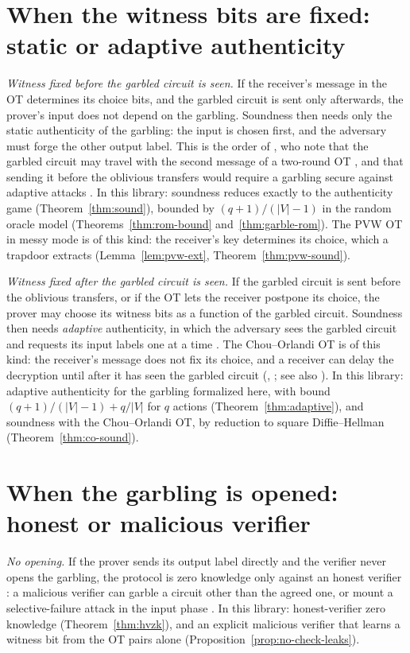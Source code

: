 \section{When the witness bits are fixed: static or adaptive authenticity}

\emph{Witness fixed before the garbled circuit is seen.} If the receiver's message in the OT
determines its choice bits, and the garbled circuit is sent only afterwards, the prover's input
does not depend on the garbling. Soundness then needs only the static authenticity of the garbling:
the input is chosen first, and the adversary must forge the other output label. This is the order of
\cite{JKO13}, who note that the garbled circuit may travel with the second message of a two-round
OT \cite[Sect.~1.1]{JKO13}, and that sending it before the oblivious transfers would require a
garbling secure against adaptive attacks \cite[Sect.~3, footnote~7]{JKO13}. In this library: soundness reduces exactly to
the authenticity game (Theorem~\ref{thm:sound}), bounded by $(q+1)/(|V|-1)$ in the random oracle
model (Theorems~\ref{thm:rom-bound} and~\ref{thm:garble-rom}). The PVW OT in messy mode is of this
kind: the receiver's key determines its choice, which a trapdoor extracts (Lemma~\ref{lem:pvw-ext},
Theorem~\ref{thm:pvw-sound}).

\emph{Witness fixed after the garbled circuit is seen.} If the garbled circuit is sent before the
oblivious transfers, or if the OT lets the receiver postpone its choice, the prover may choose its
witness bits as a function of the garbled circuit. Soundness then needs \emph{adaptive}
authenticity, in which the adversary sees the garbled circuit and requests its input labels one at a
time \cite[Sect.~4, Fig.~6]{BHR12}. The Chou--Orlandi OT is of this kind: the receiver's message does
not fix its choice, and a receiver can delay the decryption until after it has seen the garbled
circuit (\cite[Sect.~3]{BPRS17}, \cite[App.~A]{DKLs18}; see also \cite[Sect.~1.1]{CO15}). In this library: adaptive authenticity
for the garbling formalized here, with bound $(q+1)/(|V|-1) + q/|V|$ for $q$ actions
(Theorem~\ref{thm:adaptive}), and soundness with the Chou--Orlandi OT, by reduction to square
Diffie--Hellman (Theorem~\ref{thm:co-sound}).

\section{When the garbling is opened: honest or malicious verifier}

\emph{No opening.} If the prover sends its output label directly and the verifier never opens the
garbling, the protocol is zero knowledge only against an honest verifier \cite[Sect.~3]{JKO13}: a
malicious verifier can garble a circuit other than the agreed one, or mount a selective-failure
attack in the input phase \cite[Sect.~1]{JKO13}. In this library: honest-verifier zero knowledge
(Theorem~\ref{thm:hvzk}), and an explicit malicious verifier that learns a witness bit from the OT
pairs alone (Proposition~\ref{prop:no-check-leaks}).

